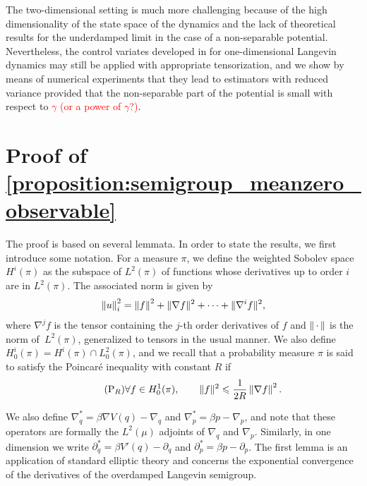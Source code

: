 \documentclass[11pt,a4paper]{article}
\newcommand{\dummy}{\,\cdot\,}
\newcommand{\grad}{\nabla}
\theoremstyle{plain}
\numberwithin{equation}{section}
\renewcommand{\leq}{\leqslant}
\begin{document}
The two-dimensional setting is much more challenging because of the high dimensionality of the state space of the dynamics
and the lack of theoretical results for the underdamped limit in the case of a non-separable potential.
Nevertheless, the control variates developed in for one-dimensional Langevin dynamics may still be applied with appropriate tensorization,
and we show by means of numerical experiments that
they lead to estimators with reduced variance provided that the non-separable part of the potential is small with respect to \textcolor{red}{$\gamma$ (or a power of $\gamma$?)}.

\appendix
\section{Proof of \texorpdfstring{\cref{proposition:semigroup_meanzero_observable}}{Proposition 2.1}}%
\label{sec:auxiliary_technical_results}

The proof is based on several lemmata.
In order to state the results, we first introduce some notation.
For a measure $\pi$, we define the weighted Sobolev space $H^i(\pi)$ as the subspace of $L^2(\pi)$
of functions whose derivatives up to order $i$ are in $L^2(\pi)$.
The associated norm is given by
\[
    \norm{u}_i^2 = \norm{f}^2 + \norm*{\nabla f}^2 + \dotsb + \norm*{\nabla^i f}^2,
\]
where  $\nabla^j f$ is the tensor containing the $j$-th order derivatives of $f$ and $\norm{\dummy}$ is the norm of~$L^2(\pi)$,
generalized to tensors in the usual manner.
We also define $H^{i}_0(\pi) = H^i(\pi) \cap L^2_0(\pi)$,
and we recall that a probability measure $\pi$ is said to satisfy the Poincaré inequality with constant $R$ if
\begin{equation}
    \label{eq:poincare}
    \tag{P$_R$}
    \forall f \in H^1_0(\pi), \qquad
    \norm*{f}^2 \leq \frac{1}{2R} \norm{\grad f}^2.
\end{equation}

We also define $\nabla_q^* = \beta \nabla V(q) - \nabla_q$ and $\nabla_p^* = \beta p - \nabla_p$,
and note that these operators are formally the $L^2(\mu)$ adjoints of $\nabla_q$ and $\nabla_p$.
Similarly, in one dimension we write $\partial_q^* = \beta V'(q) - \partial_q$ and $\partial_p^* = \beta p - \partial_p$.
The first lemma is an application of standard elliptic theory and
concerns the exponential convergence of the derivatives of the overdamped Langevin semigroup.
\end{document}
